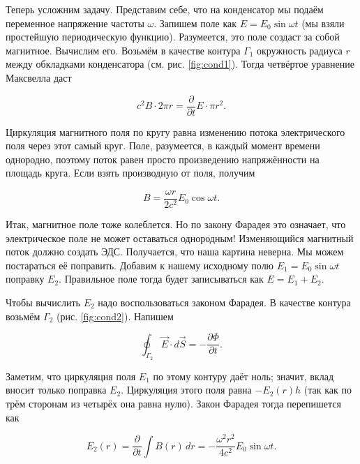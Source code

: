 \documentclass[12pt,a4paper]{article}
\numberwithin{equation}{section}
\numberwithin{equation}{section}
\newcommand{\pt}{\partial}
\begin{document}
Теперь усложним задачу. Представим себе, что на конденсатор мы подаём
переменное напряжение частоты $\omega$. Запишем поле как $E=E_0 \sin
\omega t$ (мы взяли простейшую периодическую функцию). Разумеется, это
поле создаст за собой магнитное. Вычислим его. Возьмём в качестве
контура $\Gamma_1$ окружность радиуса $r$ между обкладками
конденсатора (см. рис. \ref{fig:cond1}). Тогда четвёртое уравнение Максвелла даст

\begin{equation}
  \label{eq:cond_1}
  c^2 B \cdot 2 \pi r = \frac{\pt}{\pt t} E \cdot \pi r^2.
\end{equation}

Циркуляция магнитного поля по кругу равна изменению потока
электрического поля через этот самый круг. Поле, разумеется, в каждый
момент времени однородно, поэтому поток равен просто произведению
напряжённости на площадь круга. Если взять производную от поля,
получим

\begin{equation}
  \label{eq:cond_2}
  B = \frac{\omega r}{2c^2} E_0 \cos \omega t.
\end{equation}

Итак, магнитное поле тоже колеблется. Но по закону Фарадея это
означает, что электрическое поле не может оставаться однородным!
Изменяющийся магнитный поток должно создать ЭДС. Получается, что наша
картина неверна. Мы можем постараться её поправить. Добавим к
нашему исходному полю $E_1=E_0 \sin \omega t$ поправку
$E_2$. Правильное поле тогда будет записываться как $E=E_1+E_2$. 

Чтобы вычислить $E_2$ надо воспользоваться законом Фарадея. В качестве
контура возьмём $\Gamma_2$ (рис. \ref{fig:cond2}). Напишем 

\begin{equation}
  \label{eq:cond_3}
  \oint_{\Gamma_2} \vec{E} \cdot d \vec{S} = -\frac{\pt \Phi}{\pt t}.
\end{equation}

Заметим, что циркуляция поля $E_1$ по этому контуру даёт ноль; значит,
вклад вносит только поправка $E_2$. Циркуляция этого поля равна
$-E_2(r) h$ (так как по трём сторонам из четырёх она равна
нулю). Закон Фарадея тогда перепишется как

\begin{equation}
  \label{eq:cond_4}
  E_2 (r) = \frac{\pt}{\pt t} \int B(r)\, dr = -\frac{\omega^2
    r^2}{4c^2} E_0 \sin \omega t.
\end{equation}
\end{document}
